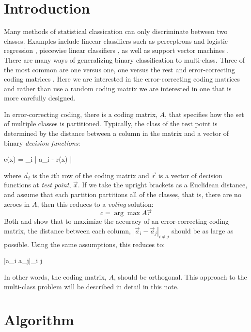 
\section{Introduction}

Many methods of statistical classication can only discriminate between two classes. 
Examples include lineear classifiers such as perceptrons and logistic regression \citep{Michie_etal1994}, 
piecewise linear classifiers \citep{Herman_Yeung1992,Mills2011},
as well as support vector machines \citep{kernel_intro}.
There are many ways of generalizing binary classification to 
multi-class.
Three of the most common are one versus one, one versus the rest and 
error-correcting coding matrices \citep{Hsu_Lin2002}.
Here we are interested in the error-correcting coding matrices
\citep{Dietterich_Bakiri1995, Windeatt_Ghaderi2002} and
rather than use a random coding matrix we are interested in one that is
more carefully designed.

In error-correcting coding, there is a coding matrix, $A$, that specifies
how the set of multiple classes is partitioned.
Typically, the class of the test point is determined by the distance between
a column in the matrix and a vector of binary {\it decision functions}:
\begin{eqnnon}
	c(\vec x) = \arg \min_i | \vec a_i - \vec r(\vec x) |
	\label{min_dist}
\end{eqnnon}
where $\vec a_i$ is the $i$th row of the coding matrix and $\vec r$
is a vector of decision functions at {\it test point}, $\vec x$.
If we take the upright brackets as a Euclidean distance, and assume that
each partition partitions all of the classes, that is, there are no zeroes
in $A$, then this reduces to a {\it voting} solution:
\begin{equation}
	c = \arg \max A \vec r \label{voting}
\end{equation}
Both \citet{Allwein_etal2000} and \citet{Windeatt_Ghaderi2002} show that to
maximize the accuracy of an error-correcting coding matrix, the distance
between each column, $|\vec a_i - \vec a_j|_{i \ne j}$ should be as
large as possible.
Using the same assumptions, this reduces to:
\begin{eqnnon}
	\min |\vec a_i \cdot \vec a_j|_{i \ne j}
\end{eqnnon}
In other words, the coding matrix, $A$, should be orthogonal.
This approach to the multi-class problem will be described in detail in this note.

\section{Algorithm}

